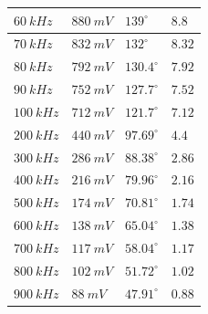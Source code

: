 \documentclass[14pt, table]{extarticle}
\begin{document}
\begin{tabular}{ | m{4cm} | m{4cm}| m{4cm} | m{3.5cm} | }
  \hline
  $60 \ kHz$ & $880 \ mV$ & $139^{\circ}$ & $8.8$ \\
  \hline
  $70 \ kHz$ & $832 \ mV$ & $132^{\circ}$ & $8.32$ \\
  \hline
  $80 \ kHz$ & $792 \ mV$ & $130.4^{\circ}$ & $7.92$ \\
  \hline
  $90 \ kHz$ & $752 \ mV$ & $127.7^{\circ}$ & $7.52$ \\
  \hline
  $100 \ kHz$ & $712 \ mV$ & $121.7^{\circ}$ & $7.12$ \\
  \hline
  $200 \ kHz$ & $440 \ mV$ & $97.69^{\circ}$ & $4.4$ \\
  \hline
  $300 \ kHz$ & $286 \ mV$ & $88.38^{\circ}$ & $2.86$ \\
  \hline
  $400 \ kHz$ & $216 \ mV$ & $79.96^{\circ}$ & $2.16$ \\
  \hline
  $500 \ kHz$ & $174 \ mV$ & $70.81^{\circ}$ & $1.74$ \\
  \hline
  $600 \ kHz$ & $138 \ mV$ & $65.04^{\circ}$ & $1.38$ \\
  \hline
  $700 \ kHz$ & $117 \ mV$ & $58.04^{\circ}$ & $1.17$ \\
  \hline
  $800 \ kHz$ & $102 \ mV$ & $51.72^{\circ}$ & $1.02$ \\
  \hline
  $900 \ kHz$ & $88 \ mV$ & $47.91^{\circ}$ & $0.88$ \\
  \hline
\end{tabular}

\newpage

\begin{figure}[H]
    \centering
    \qquad
\end{figure}
\end{document}
